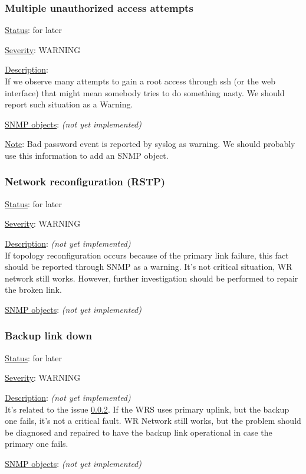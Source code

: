 \subsubsection{\bf Multiple unauthorized access attempts}
		\begin{packed_enum}
			\item [] \underline{Status}: for later
			\item [] \underline{Severity}: WARNING
			\item [] \underline{Description}:\\
				If we observe many attempts to gain a root access through ssh (or the
				web interface) that might mean somebody tries to do something nasty. We
				should report such situation as a Warning.
			\item [] \underline{SNMP objects}: \emph{(not yet implemented)}
			\item [] \underline{Note}: Bad password event is reported by syslog as
				warning. We should probably use this information to add an SNMP object.
		\end{packed_enum}

\subsubsection{\bf Network reconfiguration (RSTP)}
		\label{fail:other:rstp}
		\begin{packed_enum}
			\item [] \underline{Status}: for later
			\item [] \underline{Severity}: WARNING
			\item [] \underline{Description}: \emph{(not yet implemented)}\\
				If topology reconfiguration occurs because of the primary link failure,
				this fact should be reported through SNMP as a warning. It's not
				critical situation, WR network still works. However, further
				investigation should be performed to repair the broken link.
			\item [] \underline{SNMP objects}: \emph{(not yet implemented)}
		\end{packed_enum}

\subsubsection{\bf Backup link down}
		\begin{packed_enum}
			\item [] \underline{Status}: for later
			\item [] \underline{Severity}: WARNING
			\item [] \underline{Description}: \emph{(not yet implemented)}\\
				It's related to the issue \ref{fail:other:rstp}. If the WRS uses primary
				uplink, but the backup one fails, it's not a critical fault. WR Network
				still works, but the problem should be diagnosed and repaired to have
				the backup link operational in case the primary one fails.
			\item [] \underline{SNMP objects}: \emph{(not yet implemented)}
		\end{packed_enum}

